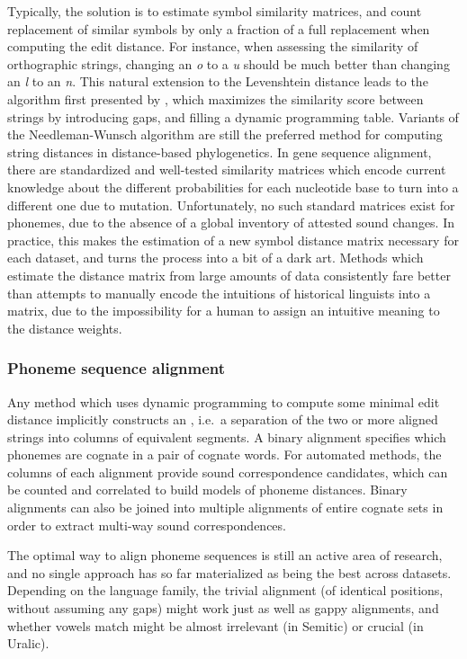 Typically, the solution is to estimate symbol similarity matrices, and count replacement of similar symbols by only a fraction of a full replacement when computing the edit distance. For instance, when assessing the similarity of  orthographic strings, changing an \textit{o} to a \textit{u} should be much better than changing an \textit{l} to an \textit{n}. This natural extension to the Levenshtein distance leads to the algorithm first presented by \citet{needleman_wunsch_1970}, which maximizes the similarity score between strings by introducing gaps, and filling a dynamic programming table. Variants of the Needleman-Wunsch algorithm are still the preferred method for computing string distances in distance-based phylogenetics. In gene sequence alignment, there are standardized and well-tested similarity matrices which encode current knowledge about the different probabilities for each nucleotide base to turn into a different one due to mutation. Unfortunately, no such standard matrices exist for 
phonemes, due to the absence of a global inventory of attested sound changes. In practice, this makes the estimation of a new symbol distance matrix necessary for each dataset, and turns the process into a bit of a dark art. Methods which estimate the distance matrix from large amounts of data consistently fare better than attempts to manually encode the intuitions of historical linguists into a matrix, due to the impossibility for a human to assign an intuitive meaning to the distance weights.

\largerpage
\subsubsection{Phoneme sequence alignment}
Any method which uses dynamic programming to compute some minimal edit distance implicitly constructs an , i.e.\ a separation of the two or more aligned strings into columns of equivalent segments. A binary alignment specifies which phonemes are cognate in a pair of cognate words. For automated methods, the columns of each alignment provide sound correspondence candidates, which can be counted and correlated to build models of phoneme distances. Binary alignments can also be joined into multiple alignments of entire cognate sets in order to extract multi-way sound correspondences.

The optimal way to align phoneme sequences is still an active area of research, and no single approach has so far materialized as being the best across datasets. Depending on the language family, the trivial alignment (of identical positions, without assuming any gaps) might work just as well as gappy alignments, and whether vowels match might be almost irrelevant (in Semitic) or crucial (in Uralic).

